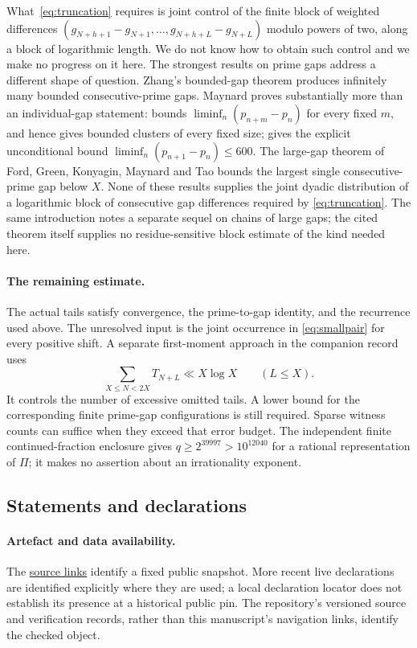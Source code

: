 \documentclass[11pt]{article}
\begin{document}
What~\eqref{eq:truncation} requires is joint control of the finite block of
weighted differences $(g_{N+h+1}-g_{N+1},\ldots,g_{N+h+L}-g_{N+L})$ modulo
powers of two, along a block of logarithmic length.  We do not know how to obtain such control and
we make no progress on it here.  The strongest results on prime gaps address a
different shape of question.  Zhang's bounded-gap theorem
\cite[Theorem~1, p.~1122]{zhang2014} produces infinitely many bounded
consecutive-prime gaps.
Maynard proves substantially more than an individual-gap statement:
\cite[Theorem~1.1, p.~384]{maynard2015} bounds
$\liminf_n(p_{n+m}-p_n)$ for every fixed $m$, and hence gives bounded clusters
of every fixed size; \cite[Theorem~1.3, p.~385]{maynard2015} gives the explicit
unconditional bound $\liminf_n(p_{n+1}-p_n)\le 600$.  The large-gap theorem of
Ford, Green, Konyagin, Maynard and Tao
\cite[Theorem~1, p.~66]{fgkmt2018} bounds the largest single consecutive-prime
gap below $X$.  None of these results supplies the joint dyadic distribution
of a logarithmic block of consecutive gap differences required by
\eqref{eq:truncation}.  The same introduction notes a separate sequel on
chains of large gaps; the cited theorem itself supplies no residue-sensitive
block estimate of the kind needed here.

\paragraph{The remaining estimate.}
The actual tails satisfy convergence, the prime-to-gap identity, and the
recurrence used above.  The unresolved input is the joint occurrence in
\eqref{eq:smallpair} for every positive shift.  A separate first-moment
approach in the companion record uses
\[
 \sum_{X\le N<2X}T_{N+L}\ll X\log X\qquad(L\le X).
\]
It controls the number of excessive omitted tails.  A lower bound for the
corresponding finite prime-gap configurations is still required.  Sparse
witness counts can suffice when they exceed that error budget.
The independent finite continued-fraction enclosure gives
$q\ge2^{39997}>10^{12040}$ for a rational representation of $\Pi$; it makes
no assertion about an irrationality exponent.

\subsection*{Statements and declarations}

\paragraph{Artefact and data availability.} The
\href{\sourceurl}{source links} identify a fixed public snapshot.
More recent live declarations are identified explicitly where they are used;
a local declaration locator does not establish its presence at a historical
public pin.  The repository's versioned source and verification records,
rather than this manuscript's navigation links, identify the checked object.
\end{document}
